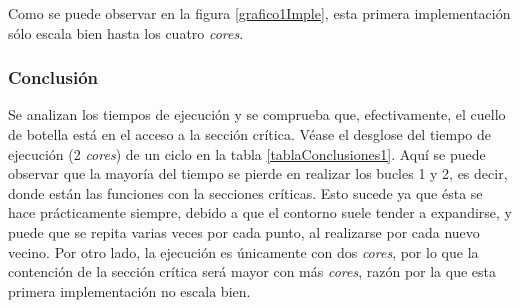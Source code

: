 Como se puede observar en la figura \ref{grafico1Imple}, esta primera implementaci\'{o}n s\'{o}lo escala bien hasta los cuatro \textit{cores}. 

\subsubsection{Conclusi\'{o}n}

Se analizan los tiempos de ejecuci\'{o}n y se comprueba que, efectivamente, el cuello de botella est\'{a} en el acceso a la secci\'{o}n cr\'{i}tica. V\'{e}ase el desglose del tiempo de ejecuci\'{o}n (2 \textit{cores}) de un ciclo en la tabla \ref{tablaConclusiones1}. Aqu\'{i} se puede observar que la mayor\'{i}a del tiempo se pierde en realizar los bucles 1 y 2, es decir, donde est\'{a}n las funciones con la secciones cr\'{i}ticas. Esto sucede ya que \'{e}sta se hace pr\'{a}cticamente siempre, debido a que el contorno suele tender a expandirse, y puede que se repita varias veces por cada punto, al realizarse por cada nuevo vecino. Por otro lado, la ejecuci\'{o}n es \'{u}nicamente con dos \textit{cores}, por lo que la contenci\'{o}n de la secci\'{o}n cr\'{i}tica ser\'{a} mayor con m\'{a}s \textit{cores}, raz\'{o}n por la que esta primera implementaci\'{o}n no escala bien.

